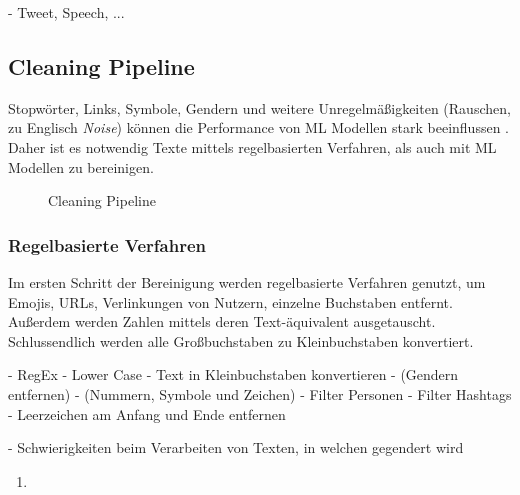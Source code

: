 - Tweet, Speech, ...

\subsection{Cleaning Pipeline} \label{subsec:cleaningPipeline}

Stopwörter, Links, Symbole, Gendern und weitere Unregelmäßigkeiten (Rauschen, zu Englisch \textit{Noise}) können die Performance von \ac{ML} Modellen stark beeinflussen \autocite[4]{kowsari_text_2019}. Daher ist es notwendig Texte mittels regelbasierten Verfahren, als auch mit \ac{ML} Modellen zu bereinigen. 


\begin{figure}[H]
    \centering
    \caption{Cleaning Pipeline} \label{fig:cleaningPipeline}
\end{figure}

\subsubsection{Regelbasierte Verfahren}

Im ersten Schritt der Bereinigung werden regelbasierte Verfahren genutzt, um Emojis, \acp{URL}, Verlinkungen von Nutzern, einzelne Buchstaben entfernt. Außerdem werden Zahlen mittels deren Text-äquivalent ausgetauscht. Schlussendlich werden alle Großbuchstaben zu Kleinbuchstaben konvertiert. 

- RegEx
    - Lower Case
    - Text in Kleinbuchstaben konvertieren
    - (Gendern entfernen)
    - (Nummern, Symbole und Zeichen)
    - Filter Personen
    - Filter Hashtags
    - Leerzeichen am Anfang und Ende entfernen

- Schwierigkeiten beim Verarbeiten von Texten, in welchen gegendert wird

\begin{enumerate}
    \item 
\end{enumerate}


